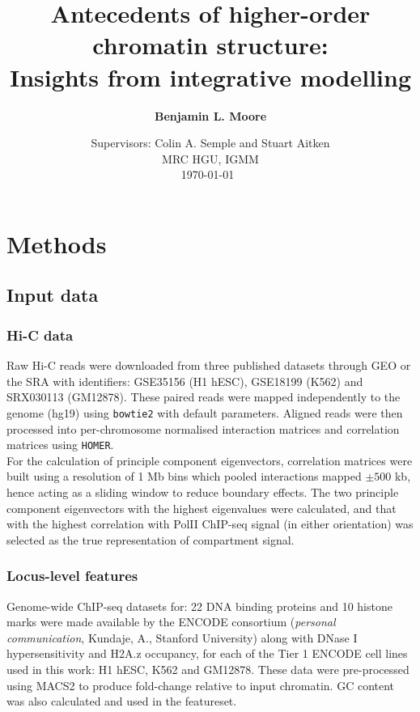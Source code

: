\documentclass[a4paper]{report}
\title{ \vspace{1in} Antecedents of higher-order chromatin structure: \\ Insights from integrative modelling}
\author{\bf Benjamin L. Moore }
\date{Supervisors: Colin A. Semple and Stuart Aitken \\ \vspace{20pt}
  \normalsize{MRC HGU, IGMM}
 \\ \today~ }
\begin{document}
\doublespacing
\maketitle

\chapter{Methods}
\section{Input data}
\subsection{Hi-C data}
Raw Hi-C reads were downloaded from three published datasets through
GEO\cite{Barrett2013} or the SRA\cite{Leinonen2011a} with identifiers:
GSE35156 (H1 hESC), GSE18199 (K562) and SRX030113 (GM12878).  These
paired reads were mapped independently to the genome (hg19) using
{{\tt bowtie2}}\cite{Langmead2012} with default parameters. Aligned
reads were then processed into per-chromosome normalised interaction
matrices and correlation matrices using {{\tt HOMER}}.\cite{Heinz2010}
\\

For the calculation of principle component eigenvectors, correlation
matrices were built using a resolution of 1 Mb bins which pooled
interactions mapped $\pm 500$ kb, hence acting as a sliding window to
reduce boundary effects. The two principle component eigenvectors with
the highest eigenvalues were calculated, and that with the highest
correlation with PolII ChIP-seq signal (in either orientation) was
selected as the true representation of compartment
signal.\cite{Kalhor2012}

\subsection{Locus-level features}
Genome-wide ChIP-seq datasets for: 22 DNA binding proteins and 10 histone marks were made
available by the ENCODE consortium\cite{Dunham2012}
(\emph{personal communication}, Kundaje, A., Stanford University) along with DNase
I hypersensitivity and H2A.z occupancy, for each of the Tier 1 ENCODE
cell lines used in this work: H1 hESC, K562 and GM12878. These data were
pre-processed using MACS2\cite{Zhang2008} to produce fold-change relative
to input chromatin. GC content was also calculated and used in the
featureset.
\end{document}
